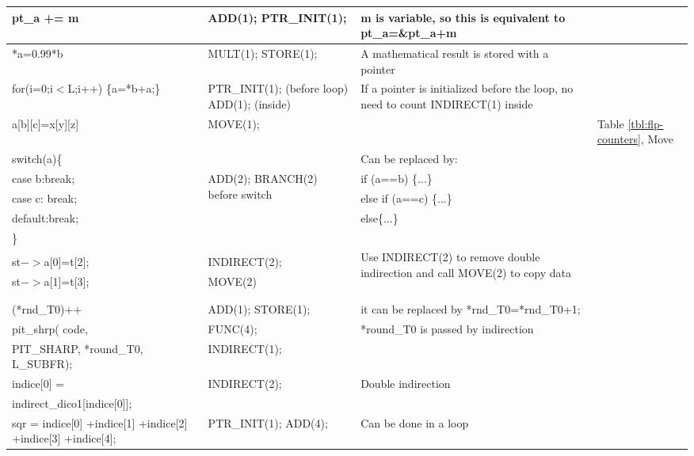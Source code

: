 \begin{center}
\begin{longtable}{|m{4.5cm}|m{4.5cm}|m{4cm}|m{2.0cm}|}
\hline
pt\_a += m	& ADD(1); PTR\_INIT(1);	& m is variable, so this is equivalent to  pt\_a=\&pt\_a+m	& \\
\hline
*a=0.99*b	& MULT(1); STORE(1); &	A mathematical result is stored with a pointer & \\
for(i=0;i$<$L;i++) \{a=*b+a;\} & PTR\_INIT(1); (before loop) ADD(1); (inside)
& If a pointer is initialized before the loop, no need to count INDIRECT(1) inside
& \\
\hline
a[b][c]=x[y][z]	& MOVE(1);	& &	Table \ref{tbl:flp-counters}, Move \\
\hline
switch(a)\{ & & Can be replaced by: &\\
case b:break; & \multirow{2}{4.5cm}{ADD(2); BRANCH(2) before switch} &
if (a==b) \{...\} &\\
case c: break; & & else if (a==c) \{...\} &\\
default:break; & & else\{...\} &\\
\} & & & \\
\hline
& & \multirow{4}{4cm}{Use INDIRECT(2) to remove
double indirection and call MOVE(2) to copy data}	& \\
st$->$a[0]=t[2]; & INDIRECT(2); & \\
st$->$a[1]=t[3];	& MOVE(2) & & \\
& & &\\
& & &\\
\hline
(*rnd\_T0)++	& ADD(1); STORE(1);	&it can be replaced by
*rnd\_T0=*rnd\_T0+1;	& \\
\hline
pit\_shrp( code,  &	FUNC(4);&	  \multirow{2}{4cm}{*round\_T0 is passed by indirection}	&\\
PIT\_SHARP, *round\_T0, L\_SUBFR); &	INDIRECT(1);& 	&\\
\hline
indice[0] = & \multirow{2}{*}{INDIRECT(2);}	& \multirow{2}{*}{Double indirection} &\\
indirect\_dico1[indice[0]];	& & &\\
\hline
sqr = indice[0] +indice[1] +indice[2] +indice[3] +indice[4];&	PTR\_INIT(1);
ADD(4);	&Can be done in a loop	&\\
\hline
\end{longtable}
\end{center}

